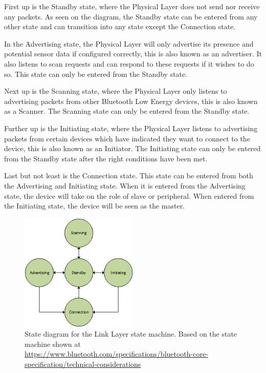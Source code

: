\documentclass[pdftex,a4paper,12pt,twoside]{report}
\begin{document}
First up is the Standby state, where the Physical Layer does not send nor receive any packets. As seen on the diagram, the Standby state can be entered from any other state and can transition into any state except the Connection state.

In the Advertising state, the Physical Layer will only advertise its presence and potential sensor data if configured correctly, this is also known as an advertiser. It also listens to scan requests and can respond to these requests if it wishes to do so. This state can only be entered from the Standby state.

Next up is the Scanning state, where the Physical Layer only listens to advertising packets from other Bluetooth Low Energy devices, this is also known as a Scanner. The Scanning state can only be entered from the Standby state.

Further up is the Initiating state, where the Physical Layer listens to advertising packets from certain devices which have indicated they want to connect to the device, this is also known as an Initiator. The Initiating state can only be entered from the Standby state after the right conditions have been met.

Last but not least is the Connection state. This state can be entered from both the Advertising and Initiating state. When it is entered from the Advertising state, the device will take on the role of slave or peripheral. When entered from the Initiating state, the device will be seen as the master.

\begin{figure}[h]
    \centering
    \includegraphics[width=0.5\textwidth]{img/llstate.png}
    \caption[State diagram for the Link Layer state machine]{State diagram for the Link Layer state machine. Based on the state machine shown at \url{https://www.bluetooth.com/specifications/bluetooth-core-specification/technical-considerations}}
    \label{fig:llstatemachine}
\end{figure}
\end{document}
